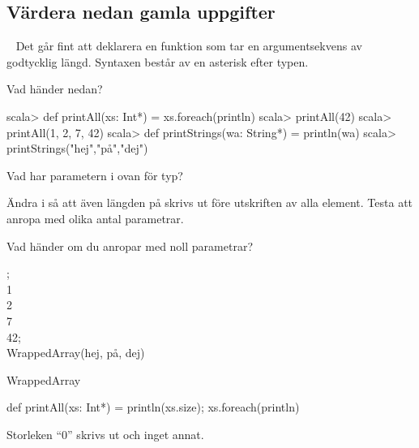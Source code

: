 \QUESTEND


\AdvancedTasks %



\subsection{\TODO Värdera nedan gamla uppgifter}



\QUESTBEGIN

\Task  \what~  Det går fint att deklarera en funktion som tar en argumentsekvens av godtycklig längd. Syntaxen består av en asterisk \code{*} efter typen.

\Subtask Vad händer nedan?
\begin{REPL}
scala> def printAll(xs: Int*) = xs.foreach(println)
scala> printAll(42)
scala> printAll(1, 2, 7, 42)
scala> def printStrings(wa: String*) = println(wa)
scala> printStrings("hej","på","dej")
\end{REPL}

\Subtask Vad har parametern  i  ovan för typ?

\Subtask Ändra i  så att även längden på  skrivs ut före utskriften av alla element. Testa att anropa  med olika antal parametrar.

\Subtask Vad händer om du anropar  med noll parametrar?

\SOLUTION


\TaskSolved \what


;\\
 1\\
 2\\
 7\\
 42;\\
 WrappedArray(hej, på, dej)

\SubtaskSolved  WrappedArray

\SubtaskSolved  def printAll(xs: Int*) = {println(xs.size); xs.foreach(println)}

\SubtaskSolved  Storleken “0” skrivs ut och inget annat.




\QUESTEND












